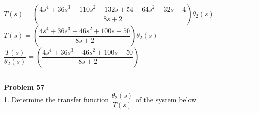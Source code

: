 \documentclass[11pt,letterpaper]{article}
\begin{document}
\begin{center}
					$T(s)=\left(\dfrac{4s^4+36s^3+110s^2+132s+54-64s^2-32s-4}{8s+2}\right)\theta_2(s)$\\

					$T(s)=\left(\dfrac{4s^4+36s^3+46s^2+100s+50}{8s+2}\right)\theta_2(s)$\\

					$\dfrac{T(s)}{\theta_2(s)}=\left(\dfrac{4s^4+36s^3+46s^2+100s+50}{8s+2}\right)$\\

					\begin{center}
\end{center}


\end{center}
			\clearpage
			\rule{\textwidth}{1pt}
			\textbf{Problem 57}\\
			1. Determine the transfer function $\dfrac{\theta_2(s)}{T(s)}$ of the system below\\
\end{document}
